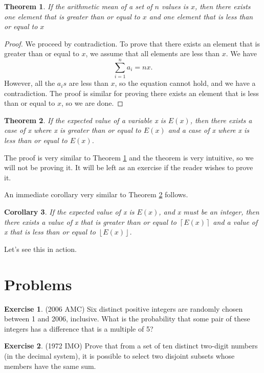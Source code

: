 \documentclass[l1pt]{article}
\theoremstyle{plain}
\newtheorem{thm}{Theorem}[section]
\newtheorem{corollary}[thm]{Corollary}
\theoremstyle{definition}
\newtheorem{exercise}{Exercise}[section]
\theoremstyle{remark}
\begin{document}
\begin{mdframed}
    \begin{thm}
    \label{thm:arithmetic mean}
    If the arithmetic mean of a set of $n$ values is $x$, then there exists one element that is greater than or equal to $x$ and one element that is less than or equal to $x$
    \end{thm}
\end{mdframed}

\begin{proof}
We proceed by contradiction. To prove that there exists an element that is greater than or equal to $x$, we assume that all elements are less than $x$. We have \[\sum_{i=1}^n a_i=nx .\] However, all the $a_is$ are less than $x$, so the equation cannot hold, and we have a contradiction. The proof is similar for proving there exists an element that is less than or equal to $x$, so we are done.
\end{proof}

\begin{mdframed}
    \begin{thm}
    \label{thm:expected value}
    If the expected value of a variable x is $E(x)$, then there exists a case of x where x is greater than or equal to $E(x)$ and a case of x where x is less than or equal to $E(x)$.
    \end{thm}
\end{mdframed}

The proof is very similar to Theorem \ref{thm:arithmetic mean} and the theorem is very intuitive, so we will not be proving it. It will be left as an exercise if the reader wishes to prove it. 

An immediate corollary very similar to Theorem \ref{thm:expected value} follows.

\begin{mdframed}
    \begin{corollary}
    If the expected value of x is $E(x)$, and x must be an integer, then there exists a value of x that is greater than or equal to $\left \lceil{E(x)}\right \rceil$ and a value of x that is less than or equal to $\left \lfloor{E(x)}\right \rfloor $.
    \end{corollary}
\end{mdframed}

Let's see this in action.






\section{Problems}

\begin{exercise}
(2006 AMC) Six distinct positive integers are randomly chosen between 1 and 2006, inclusive. What is the probability that some pair of these integers has a difference that is a multiple of 5?
\end{exercise}

\begin{exercise}
(1972 IMO) Prove that from a set of ten distinct two-digit numbers (in the decimal system), it is possible to select two disjoint subsets whose members have the same sum.
\end{exercise}
\end{document}

